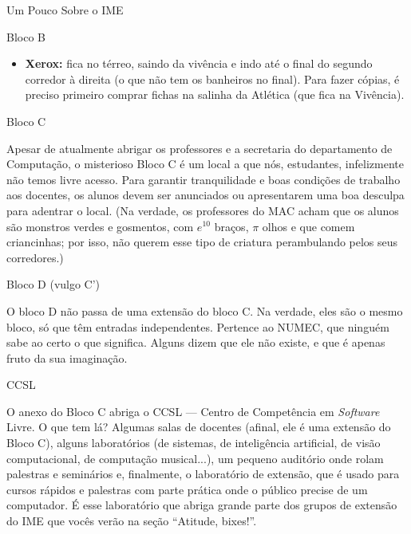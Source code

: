 \begin{secao}{Um Pouco Sobre o IME}
\begin{subsecao}{Bloco B}
\begin{itemize}
\item{\bf Xerox:} fica no térreo, saindo da vivência e indo até o final do segundo
  corredor à direita (o que não tem os banheiros no final). Para fazer cópias,
  é preciso primeiro comprar fichas na salinha da Atlética (que fica na Vivência).
\end{itemize}

\end{subsecao}






\begin{subsecao}{Bloco C}

Apesar de atualmente abrigar os professores e a secretaria do departamento de
Computação, o misterioso Bloco C é um local a que nós, estudantes, infelizmente não
temos livre acesso. Para garantir tranquilidade e boas condições de trabalho aos
docentes, os alunos devem ser anunciados ou apresentarem uma boa desculpa para
adentrar o local. (Na verdade, os professores do MAC acham que os alunos são monstros
verdes e gosmentos, com $e^{10}$ braços, $\pi$ olhos e que comem criancinhas;
por isso, não querem esse tipo de criatura perambulando pelos seus corredores.)

\end{subsecao}

\begin{subsecao}{Bloco D (vulgo C')}

O bloco D não passa de uma extensão do bloco C. Na verdade, eles são o mesmo bloco,
só que têm entradas independentes. Pertence ao NUMEC, que ninguém sabe ao certo
o que significa. Alguns dizem que ele não existe, e que é apenas fruto da sua
imaginação.

\end{subsecao}

\begin{subsecao}{CCSL}

O anexo do Bloco C abriga o CCSL --- Centro de Competência em \textit{Software}
Livre. O que tem lá? Algumas salas de docentes (afinal, ele é uma extensão do
Bloco C), alguns laboratórios (de sistemas, de inteligência artificial,
de visão computacional, de computação musical...), um pequeno auditório
onde rolam palestras e seminários e, finalmente, o laboratório de extensão,
que é usado para cursos rápidos e palestras com parte prática onde o público
precise de um computador. É esse laboratório que abriga grande parte dos grupos
de extensão do IME que vocês verão na seção ``Atitude, bixes!''.


\end{subsecao}
\end{secao}
